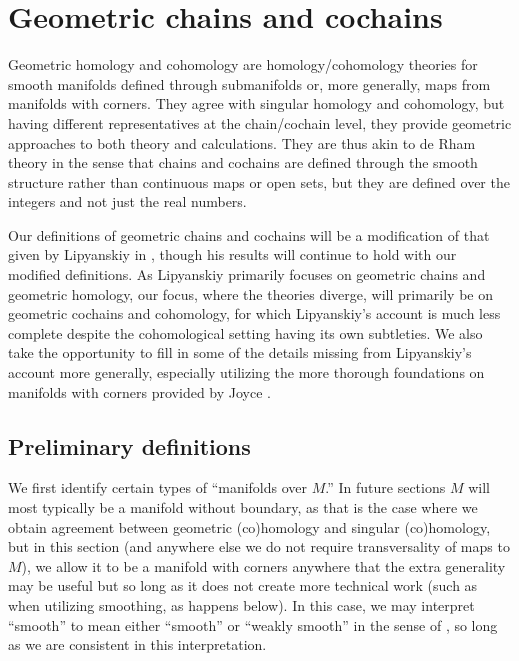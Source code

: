
\section{Geometric chains and cochains}\label{S: geometric cochains}

Geometric homology and cohomology are homology/cohomology theories for smooth manifolds defined through submanifolds or, more generally, maps from manifolds with corners.
They agree with singular homology and cohomology, but having different representatives
at the chain/cochain level, they provide geometric approaches to both theory and calculations.
They are thus akin to de Rham theory in the sense that chains and cochains are defined through the smooth structure rather than continuous maps or open sets,
but they are defined over the integers and not just the real numbers.

Our definitions of geometric chains and cochains will be a modification of that given by Lipyanskiy in \cite{Lipy14}, though his results will continue to hold with our modified definitions. As Lipyanskiy primarily focuses on geometric chains and geometric homology, our focus, where the theories diverge, will primarily be on geometric cochains and cohomology, for which Lipyanskiy's account is much less complete despite the cohomological setting having its own subtleties. We also take the opportunity to fill in some of the details missing from Lipyanskiy's account more generally, especially utilizing the more thorough foundations on manifolds with corners provided by Joyce \cite{Joy12}.

\subsection{Preliminary definitions}

We first identify certain types of ``manifolds over $M$.'' In future sections $M$ will most typically be a manifold without boundary, as that is the case where we obtain agreement between geometric (co)homology and singular (co)homology, but in this section (and anywhere else we do not require transversality of maps to $M$), we allow it to be a manifold with corners anywhere that the extra generality may be useful but so long as it does not create more technical work (such as when utilizing smoothing, as happens below). In this case, we may interpret ``smooth'' to mean either ``smooth'' or ``weakly smooth'' in the sense of \cite{Joy12}, so long as we are consistent in this interpretation.

